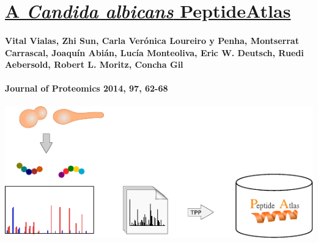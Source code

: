 %
%


\chapter*{\href{http://www.ncbi.nlm.nih.gov/pubmed/23811049}{A \textit{Candida albicans} PeptideAtlas}}



\subsubsection*{Vital Vialas, Zhi Sun, Carla Ver\'onica Loureiro y Penha, Montserrat Carrascal, Joaqu\'in Abi\'an, Luc\'ia Monteoliva, Eric W. Deutsch, Ruedi Aebersold, Robert L. Moritz, Concha Gil}
\subsubsection*{Journal of Proteomics 2014, 97, 62-68}


\bigskip
\hfill
\includegraphics[width=1\textwidth]{Imagenes/Vectorial/graphical_abstract_PeptideAtlas1}



